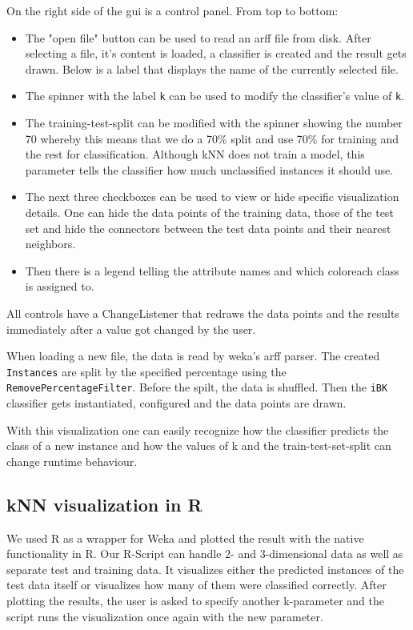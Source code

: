 \documentclass[paper=a4, fontsize=11pt]{scrartcl} %
\numberwithin{equation}{section} %
\numberwithin{figure}{section} %
\numberwithin{table}{section} %
\begin{document}
On the right side of the gui is a control panel. From top to bottom:

\begin{itemize}
\item The "open file" button can be used to read an arff file from disk. After selecting a file, it's content is loaded, a classifier is created and the result gets drawn. Below is a label that displays the name of the currently selected file.
\item The spinner with the label \texttt{k} can be used to modify the classifier's value of \texttt{k}.
\item The training-test-split can be modified with the spinner showing the number 70 whereby this means that we do a 70\% split and use 70\% for training and the rest for classification. Although kNN does not train a model, this parameter tells the classifier how much unclassified instances it should use.
\item The next three checkboxes can be used to view or hide specific visualization details. One can hide the data points of the training data, those of the test set and hide the connectors between the test data points and their nearest neighbors.
\item Then there is a legend telling the attribute names and which coloreach class is assigned to.
\end{itemize}

All controls have a ChangeListener that redraws the data points and the results immediately after a value got changed by the user.

When loading a new file, the data is read by weka's arff parser. The created \texttt{Instances} are split by the specified percentage using the \texttt{RemovePercentageFilter}. Before the spilt, the data is shuffled. Then the \texttt{iBK} classifier gets instantiated, configured and the data points are drawn.

With this visualization one can easily recognize how the classifier predicts the class of a new instance and how the values of k and the train-test-set-split can change runtime behaviour.




\subsection{kNN visualization in R}

We used R as a wrapper for Weka and plotted the result with the native functionality in R. Our R-Script can handle 2- and 3-dimensional data as well as separate test and training data. It visualizes either the predicted instances of the test data itself or visualizes how many of them were classified correctly. After plotting the results, the user is asked to specify another k-parameter and the script runs the visualization once again with the new parameter.
\end{document}
